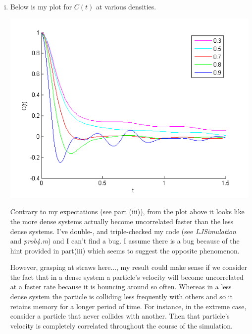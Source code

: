 \documentclass{article}
\begin{document}
\begin{enumerate}[i.]
  \item Below is my plot for $C(t)$ at various densities.
    \begin{center}
      \includegraphics[scale=0.7]{4vi}
    \end{center}
    
    Contrary to my expectations (see part (iii)), from the plot above it looks like the more dense systems actually become uncorrelated faster than the less dense systems. I've double-, and triple-checked my code (see \textit{LJSimulation} and \textit{prob4.m}) and I can't find a bug. I assume there is a bug because of the hint provided in part(iii) which seems to suggest the opposite phenomenon.

    However, grasping at straws here..., my result could make sense if we consider the fact that in a dense system a particle's velocity will become uncorrelated at a faster rate because it is bouncing around so often. Whereas in a less dense system the particle is colliding less frequently with others and so it retains memory for a longer period of time. For instance, in the extreme case, consider a particle that never collides with another. Then that particle's velocity is completely correlated throughout the course of the simulation.

\end{enumerate}
\end{document}
